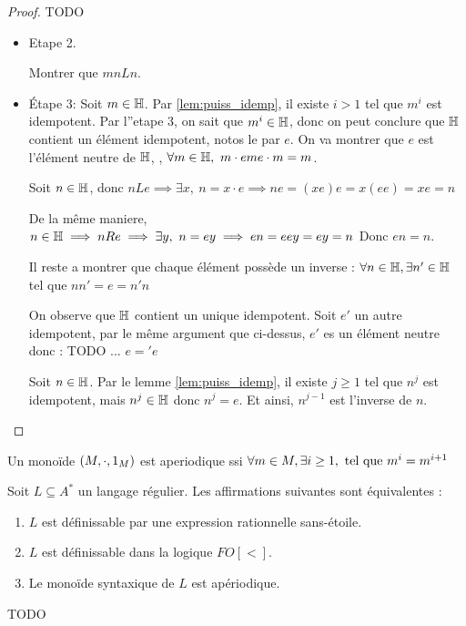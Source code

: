 \begin{proof}
	TODO

	\begin{itemize}
		\item Etape 2.

		      \begin{exercice}
			      Montrer que $mn L n$.
		      \end{exercice}
		\item Étape 3: Soit $m \in \mathbb{H}$. Par \ref{lem:puiss_idemp}, il existe $i > 1$ tel que $m^i$ est idempotent.
		      Par l''etape 3, on sait que $m^i \in \mathbb{H}$, donc on peut conclure que $\mathbb{H}$ contient un élément idempotent, notos le par
		      $e$. On va montrer que $e$ est l'élément neutre de $\mathbb{H}$, \cad, $\forall m \in \mathbb{H}, \ m\cdot e m  e \cdot m = m$.

		      Soit $n \in \mathbb{H}$, donc $n L e \implies \exists x, \ n = x\cdot e
			      \implies n e = (x e) e =  x (ee) =  x e = n$

		      De la même maniere, $n \in \mathbb{H} \implies n R e \implies \exists y, \ n = ey \implies en = eey = ey = n$
		      Donc $e n = n$.

		      Il reste a montrer que chaque élément possède un inverse : $\forall n \in \mathbb{H}, \exists n' \in \mathbb{H}$ tel que $n n' = e = n'n$

		      On observe que $\mathbb{H}$ contient un unique idempotent. Soit $e'$ un autre idempotent, par le même argument
		      que ci-dessus, $e'$ es un élément neutre donc : TODO ... $e = 'e$

		      Soit $n \in \mathbb{H}$. Par le lemme \ref{lem:puiss_idemp}, il existe $j \geq 1$ tel que $n^j$ est idempotent, mais $n^j \in \mathbb{H}$ donc $n^j = e$. Et ainsi,
		      $n^{j-1}$ est l'inverse de $n$.
	\end{itemize}
\end{proof}

\begin{definition}
	Un monoïde $(M, \cdot, 1_M)$ est aperiodique ssi $\forall m \in M, \exists i \geq 1, \text { tel que } m^i = m^{i+1}$
\end{definition}


\begin{theorem}[Schützenberger]
	Soit $L\subseteq A^*$ un langage régulier. Les affirmations suivantes sont équivalentes :
	\begin{enumerate}
		\item $L$ est définissable par une expression rationnelle sans-étoile.
		\item $L$ est définissable dans la logique $FO[<]$.
		\item Le monoïde syntaxique de $L$ est apériodique.
	\end{enumerate}
\end{theorem}

TODO

